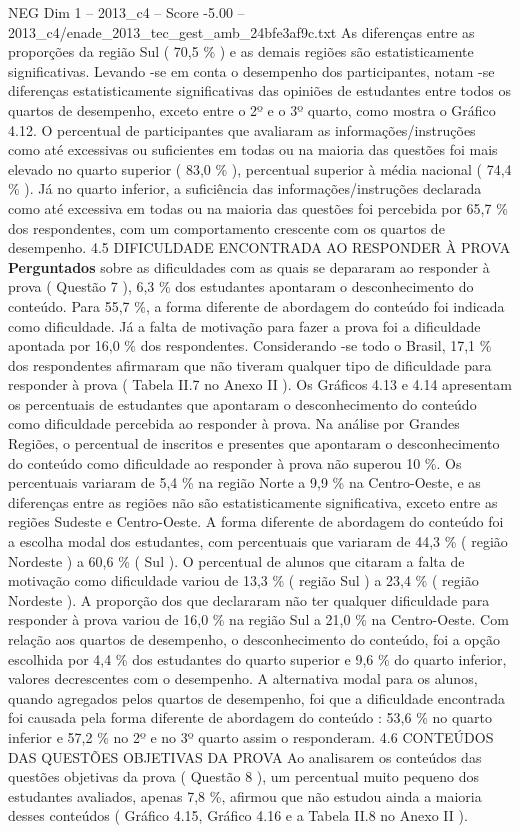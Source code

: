 \begin{textsample}{NEG Dim 1 – 2013\_c4 – Score -5.00 – 2013\_c4/enade\_2013\_tec\_gest\_amb\_24bfe3af9c.txt}
As diferenças entre as proporções da região Sul ( 70,5 \% ) e as demais regiões são estatisticamente significativas.
Levando -se em conta o desempenho dos participantes, notam -se diferenças estatisticamente significativas das opiniões de estudantes entre todos os quartos de desempenho, exceto entre o 2º e o 3º quarto, como mostra o Gráfico 4.12.
O percentual de participantes que avaliaram as informações/instruções como até excessivas ou suficientes em todas ou na maioria das questões foi mais elevado no quarto superior ( 83,0 \% ), percentual superior à média nacional ( 74,4 \% ).
Já no quarto inferior, a suficiência das informações/instruções declarada como até excessiva em todas ou na maioria das questões foi percebida por 65,7 \% dos respondentes, com um comportamento crescente com os quartos de desempenho. 4.5 DIFICULDADE ENCONTRADA AO RESPONDER À PROVA \textbf{Perguntados} sobre as dificuldades com as quais se depararam ao responder à prova ( Questão 7 ), 6,3 \% dos estudantes apontaram o desconhecimento do conteúdo.
Para 55,7 \%, a forma diferente de abordagem do conteúdo foi indicada como dificuldade.
Já a falta de motivação para fazer a prova foi a dificuldade apontada por 16,0 \% dos respondentes.
Considerando -se todo o Brasil, 17,1 \% dos respondentes afirmaram que não tiveram qualquer tipo de dificuldade para responder à prova ( Tabela II.7 no Anexo II ).
Os Gráficos 4.13 e 4.14 apresentam os percentuais de estudantes que apontaram o desconhecimento do conteúdo como dificuldade percebida ao responder à prova.
Na análise por Grandes Regiões, o percentual de inscritos e presentes que apontaram o desconhecimento do conteúdo como dificuldade ao responder à prova não superou 10 \%.
Os percentuais variaram de 5,4 \% na região Norte a 9,9 \% na Centro-Oeste, e as diferenças entre as regiões não são estatisticamente significativa, exceto entre as regiões Sudeste e Centro-Oeste.
A forma diferente de abordagem do conteúdo foi a escolha modal dos estudantes, com percentuais que variaram de 44,3 \% ( região Nordeste ) a 60,6 \% ( Sul ).
O percentual de alunos que citaram a falta de motivação como dificuldade variou de 13,3 \% ( região Sul ) a 23,4 \% ( região Nordeste ).
A proporção dos que declararam não ter qualquer dificuldade para responder à prova variou de 16,0 \% na região Sul a 21,0 \% na Centro-Oeste.
Com relação aos quartos de desempenho, o desconhecimento do conteúdo, foi a opção escolhida por 4,4 \% dos estudantes do quarto superior e 9,6 \% do quarto inferior, valores decrescentes com o desempenho.
A alternativa modal para os alunos, quando agregados pelos quartos de desempenho, foi que a dificuldade encontrada foi causada pela forma diferente de abordagem do conteúdo : 53,6 \% no quarto inferior e 57,2 \% no 2º e no 3º quarto assim o responderam. 4.6 CONTEÚDOS DAS QUESTÕES OBJETIVAS DA PROVA Ao analisarem os conteúdos das questões objetivas da prova ( Questão 8 ), um percentual muito pequeno dos estudantes avaliados, apenas 7,8 \%, afirmou que não estudou ainda a maioria desses conteúdos ( Gráfico 4.15, Gráfico 4.16 e a Tabela II.8 no Anexo II ).

\end{textsample}
